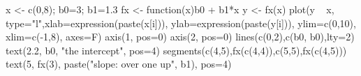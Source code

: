 \begin{Schunk}
\begin{Sinput}
 x <- c(0,8); b0=3; b1=1.3
 fx <- function(x){b0 + b1*x}
 y <- fx(x)
 plot(y ~ x, type="l",xlab=expression(paste(x[i])), ylab=expression(paste(y[i])), ylim=c(0,10), xlim=c(-1,8), axes=F)
 axis(1, pos=0)
 axis(2, pos=0)
 lines(c(0,2),c(b0, b0),lty=2)
 text(2.2, b0, "the intercept", pos=4)
 segments(c(4,5),fx(c(4,4)),c(5,5),fx(c(4,5)))
 text(5, fx(3), paste("slope: \n over one \n up", b1), pos=4)
\end{Sinput}
\end{Schunk}
